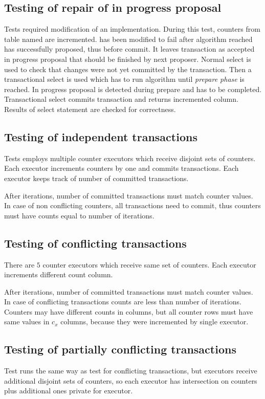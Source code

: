 \subsection{Testing of repair of in progress proposal}
Tests required modification of an implementation. During this test, counters from table named  are incremented. \mpt has been modified to fail after algorithm reached has successfully proposed, thus before commit. It leaves transaction as accepted in progress proposal that should be finished by next proposer. 
Normal select is used to check that changes were not yet committed by the transaction. 
Then a transactional select is used which has to run \mpt algorithm until \emph{prepare phase} is reached. In progress proposal is detected during prepare and has to be completed. Transactional select commits transaction and returns incremented column. Results of select statement are checked for correctness. 

\subsection{Testing of independent transactions}
Tests employs multiple counter executors which receive disjoint sets of counters. Each executor increments counters by one and commits transactions. Each executor keeps track of number of committed transactions.

After iterations, number of committed transactions must match counter values. In case of non conflicting counters, all transactions need to commit, thus counters must have counts equal to number of iterations.

\subsection{Testing of conflicting transactions}
There are $5$ counter executors which receive same set of counters. Each executor increments different count column. 

After iterations, number of committed transactions must match counter values. In case of conflicting transactions counts are less than number of iterations. Counters may have different counts in columns, but all counter rows must have same values in $c_{x}$ columns, because they were incremented by single executor.

\subsection{Testing of partially conflicting transactions}
Test runs the same way as test for conflicting transactions, but executors receive additional disjoint sets of counters, so each executor has intersection on counters plus additional ones private for executor. 

